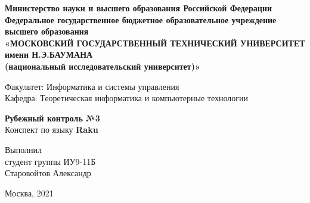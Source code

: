 \documentclass[12pt,a4paper,oneside,titlepage]{article}
\begin{document}
\begin{center}
  \hfill \break
  \textbf{
    \footnotesize{Министерство науки и высшего образования Российской Федерации}\\
    \hfill \break
    \footnotesize{Федеральное государственное бюджетное образовательное учреждение высшего образования}\\
    \small{«МОСКОВСКИЙ ГОСУДАРСТВЕННЫЙ ТЕХНИЧЕСКИЙ УНИВЕРСИТЕТ имени Н.Э.БАУМАНА\\(национальный исследовательский университет)»}}\\
\end{center}
\hfill \break
\normalsize{Факультет: Информатика и системы управления}\\
\hfill \break
\normalsize{Кафедра: Теоретическая информатика и компьютерные технологии}\\
\hfill\break
\begin{center}
  \textbf{\large{Рубежный контроль №3}}\\
  \large{Конспект по языку \bfseries{Raku}}\\
\end{center}
\hfill \break
\hfill \break
\hfill \break
\begin{flushright}
  \normalsize{
    Выполнил\\
    студент группы ИУ9-11Б\\
    Старовойтов Александр
  }
\end{flushright}
\hfill \break
\hfill \break
\hfill \break
\hfill \break
\hfill \break
\hfill \break
\hfill \break
\hfill \break
\hfill \break
\hfill \break
\hfill \break

\begin{center} Москва, 2021 \end{center}
\thispagestyle{empty} %
\end{document}
